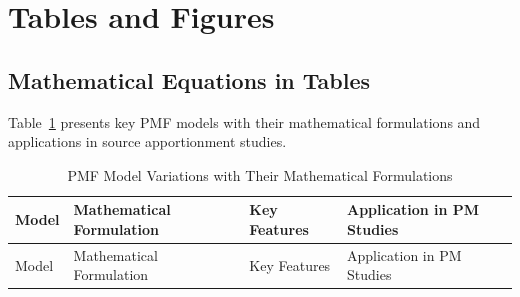 \documentclass[
  letterpaper,
  oneside,
  openany]{MastersDoctoralThesis}
\begin{document}
\section{Tables and Figures}\label{sec-ch1-tables}

\subsection{Mathematical Equations in Tables}\label{sec-ch1-math-tables}

Table~\ref{tbl-ch1-pmf-models} presents key PMF models with their
mathematical formulations and applications in source apportionment
studies.

\begin{longtable}[]{@{}
  >{\raggedright\arraybackslash}p{}
  >{\raggedright\arraybackslash}p{}
  >{\raggedright\arraybackslash}p{}
  >{\raggedright\arraybackslash}p{}@{}}
\caption{PMF Model Variations with Their Mathematical
Formulations}\label{tbl-ch1-pmf-models}\tabularnewline
\toprule\noalign{}
\begin{minipage}[b]{\linewidth}\raggedright
Model
\end{minipage} & \begin{minipage}[b]{\linewidth}\raggedright
Mathematical Formulation
\end{minipage} & \begin{minipage}[b]{\linewidth}\raggedright
Key Features
\end{minipage} & \begin{minipage}[b]{\linewidth}\raggedright
Application in PM Studies
\end{minipage} \\
\midrule\noalign{}
\endfirsthead
\toprule\noalign{}
\begin{minipage}[b]{\linewidth}\raggedright
Model
\end{minipage} & \begin{minipage}[b]{\linewidth}\raggedright
Mathematical Formulation
\end{minipage} & \begin{minipage}[b]{\linewidth}\raggedright
Key Features
\end{minipage} & \begin{minipage}[b]{\linewidth}\raggedright
Application in PM Studies
\end{minipage} \\

\end{longtable}
\end{document}

